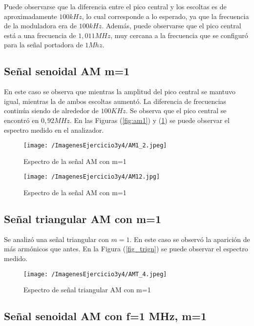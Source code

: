 Puede observarse que la diferencia entre el pico central y los escoltas es de aproximadamente $100 kHz$, lo cual corresponde a lo esperado, ya que la frecuencia de la moduladora era de $100 kHz$. Además, puede observarse que el pico central está a una frecuencia de $1,011 MHz$, muy cercana a la frecuencia que se configuró para la señal portadora de $1 Mhz$.

\subsection{Señal senoidal AM m=1}

En este caso se observa que mientras la amplitud del pico central se mantuvo igual, mientras la de ambos escoltas aumentó. La diferencia de frecuencias continúa siendo de alrededor de $100 KHz$. Se observa que el pico central se encontró en $0,92 MHz$. En las Figuras (\ref{fig:am1}) y (\ref{fig:am2}) se puede observar el espectro medido en el analizador.

\begin{figure}[H]
  \centering
  \begin{minipage}[b]{0.6\textwidth}
    \texttt{[image: /ImagenesEjercicio3y4/AM1\_2.jpeg]}
    \caption{Espectro de la señal AM con m=1}
    \label{fig:am1}
  \end{minipage}
  \hfill
  \begin{minipage}[b]{0.6\textwidth}
    \texttt{[image: /ImagenesEjercicio3y4/AM12.jpg]}
    \caption{Espectro de la señal AM con m=1}
    \label{fig:am2}
  \end{minipage}
\end{figure}

\subsection{Señal triangular AM con m=1}
Se analizó una señal triangular con $m=1$. En este caso se observó la aparición de más armónicos que antes. En la Figura (\ref{fig_trign}) se puede observar el espectro medido.

\begin{figure}[H]
	\centering
	\texttt{[image: /ImagenesEjercicio3y4/AMT\_4.jpeg]}
\caption{Espectro de señal triangular AM con m=1}
	\label{fig:trign}
\end{figure}

\subsection{Señal senoidal AM con f=1 MHz, m=1 }

